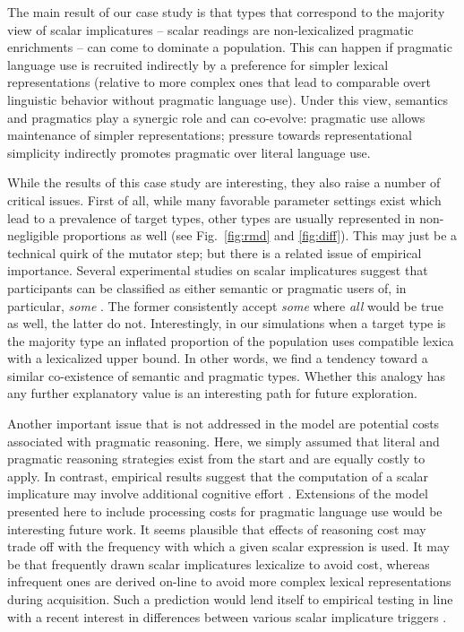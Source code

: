 \documentclass[a4paper, 11pt]{article}
\theoremstyle{Satz}
\begin{document}
The main result of our case study is that types that correspond to the majority view of scalar
implicatures -- scalar readings are non-lexicalized pragmatic enrichments -- can come to
dominate a population. This can happen if pragmatic language use is recruited indirectly by a
preference for simpler lexical representations (relative to more complex ones that lead to
comparable overt linguistic behavior without pragmatic language use). Under this view,
semantics and pragmatics play a synergic role and can co-evolve: pragmatic use allows
maintenance of simpler representations; pressure towards representational simplicity indirectly
promotes pragmatic over literal language use. 

While the results of this case study are interesting, they also raise a number of critical
issues. First of all, while many favorable parameter settings exist which lead to a prevalence
of target types, other types are usually represented in non-negligible proportions as well (see
Fig.~\ref{fig:rmd} and \ref{fig:diff}). This may just be a technical quirk of the mutator step;
but there is a related issue of empirical importance. Several experimental studies on scalar
implicatures suggest that participants can be classified as either semantic or pragmatic users
of, in particular, \emph{some}
\citep[e.g.,][]{BottNoveck2004:Some-Utterances,NieuwlandDitman2010:On-the-incremen,DegenTanenhaus2012:Processing-Scal}. The
former consistently accept \emph{some} where \emph{all} would be true as well, the latter do
not. Interestingly, in our simulations when a target type is the majority type an inflated
proportion of the population uses compatible lexica with a lexicalized upper bound. In other
words, we find a tendency toward a similar co-existence of semantic and pragmatic
types. Whether this analogy has any further explanatory value is an interesting path for future
exploration.

Another important issue that is not addressed in the model are potential costs associated with
pragmatic reasoning. Here, we simply assumed that literal and pragmatic reasoning strategies
exist from the start and are equally costly to apply. In contrast, empirical results suggest
that the computation of a scalar implicature may involve additional cognitive effort
\citep[e.g.,][]{BrehenyKatsos2006:Are-Generalised,deNeys+schaeken:2007,huang+snedeker:2009,Jr.Bailey2013:Possibly-all-of}. Extensions
of the model presented here to include processing costs for pragmatic language use would be
interesting future work. It seems plausible that effects of reasoning cost may trade off with
the frequency with which a given scalar expression is used. It may be that frequently drawn
scalar implicatures lexicalize to avoid cost, whereas infrequent ones are derived on-line to
avoid more complex lexical representations during acquisition. Such a prediction would lend itself to
empirical testing in line with a recent interest in differences between various scalar
implicature triggers \citep{Tielvan-TielMiltenburgvan-Miltenburg2014:Scalar-Diversit}. 
\end{document}
